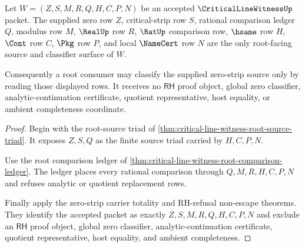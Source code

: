 \begin{theorem}
\label{thm:critical-line-witness-source-modulus-classifier-lock}
Let $W=(Z,S,M,R,Q,H,C,P,N)$ be an accepted $\CriticalLineWitnessUp$ packet. The supplied zero row $Z$, critical-strip row $S$, rational comparison ledger $Q$, modulus row $M$, $\RealUp$ row $R$, $\RatUp$ comparison row, $\hsame$ row $H$, $\Cont$ row $C$, $\Pkg$ row $P$, and local $\NameCert$ row $N$ are the only root-facing source and classifier surface of $W$.

Consequently a root consumer may classify the supplied zero-strip source only by reading those displayed rows. It receives no $\mathsf{RH}$ proof object, global zero classifier, analytic-continuation certificate, quotient representative, host equality, or ambient completeness coordinate.
\end{theorem}
\begin{proof}
Begin with the root-source triad of \autoref{thm:critical-line-witness-root-source-triad}. It exposes $Z,S,Q$ as the finite source triad carried by $H,C,P,N$.

Use the root comparison ledger of \autoref{thm:critical-line-witness-root-comparison-ledger}. The ledger places every rational comparison through $Q,M,R,H,C,P,N$ and refuses analytic or quotient replacement rows.

Finally apply the zero-strip carrier totality and RH-refusal non-escape theorems. They identify the accepted packet as exactly $Z,S,M,R,Q,H,C,P,N$ and exclude an $\mathsf{RH}$ proof object, global zero classifier, analytic-continuation certificate, quotient representative, host equality, and ambient completeness.
\end{proof}

